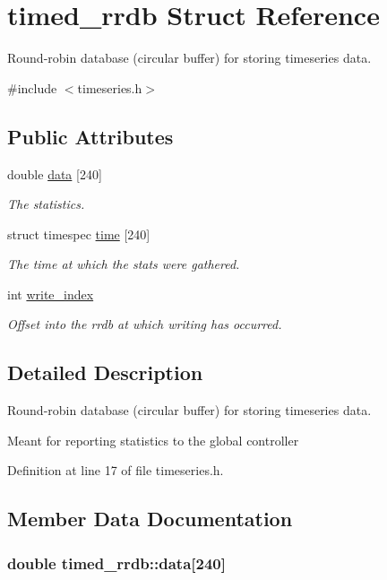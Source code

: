 \hypertarget{structtimed__rrdb}{\section{timed\-\_\-rrdb Struct Reference}
\label{structtimed__rrdb}
}


Round-\/robin database (circular buffer) for storing timeseries data.  




{\ttfamily \#include $<$timeseries.\-h$>$}

\subsection*{Public Attributes}
\begin{DoxyCompactItemize}
\item 
double \hyperlink{structtimed__rrdb_af2d8f1edb6d62eb38ce97d8f65570182}{data} \mbox{[}240\mbox{]}
\begin{DoxyCompactList}\small\item\em The statistics. \end{DoxyCompactList}\item 
struct timespec \hyperlink{structtimed__rrdb_abcf16b68b8b0bb8eb6a3c1e266b4c2f8}{time} \mbox{[}240\mbox{]}
\begin{DoxyCompactList}\small\item\em The time at which the stats were gathered. \end{DoxyCompactList}\item 
int \hyperlink{structtimed__rrdb_ab0c1ce0ef397283f1f93ed5d03583bab}{write\-\_\-index}
\begin{DoxyCompactList}\small\item\em Offset into the rrdb at which writing has occurred. \end{DoxyCompactList}\end{DoxyCompactItemize}


\subsection{Detailed Description}
Round-\/robin database (circular buffer) for storing timeseries data. 

Meant for reporting statistics to the global controller 

Definition at line 17 of file timeseries.\-h.



\subsection{Member Data Documentation}
\hypertarget{structtimed__rrdb_af2d8f1edb6d62eb38ce97d8f65570182}{
\subsubsection[{data}]{\setlength{\rightskip}{0pt plus 5cm}double timed\-\_\-rrdb\-::data\mbox{[}240\mbox{]}}}\label{structtimed__rrdb_af2d8f1edb6d62eb38ce97d8f65570182}


